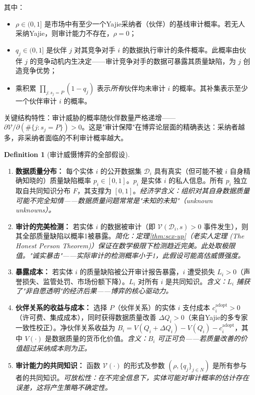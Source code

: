 \documentclass[12pt,a4paper]{ctexart}
\theoremstyle{definition}
\newtheorem{definition}{Definition}[section]
\theoremstyle{remark}
\begin{document}
其中：
\begin{itemize}[itemsep=2pt]
\item $\rho \in (0, 1]$ 是市场中有至少一个Yajie采纳者（伙伴）的基线审计概率。若无人采纳Yajie，则审计能力不存在，$\rho = 0$；
\item $q_j \in (0, 1]$ 是伙伴 $j$ 对其竞争对手 $i$ 的数据执行审计的条件概率。此概率由伙伴 $j$ 的竞争动机内生决定——审计竞争对手的数据可暴露其质量缺陷，为 $j$ 创造竞争优势；
\item 乘积累 $\prod_{j: s_j = P} (1 - q_j)$ 表示\textit{所有}伙伴均未审计 $i$ 的概率。其补集表示至少一个伙伴审计 $i$ 的概率。
\end{itemize}

关键结构特性：审计威胁的概率随伙伴数量严格递增——$\partial \mathcal{V} / \partial (\#\{j: s_j = P\}) > 0$。这是"审计保障"在博弈论层面的精确表达：采纳者越多，非采纳者面临的不利审计概率越大。

\begin{definition}[审计威慑博弈的全部假设]
\label{def:ad-assumptions}
\begin{enumerate}[label=\textbf{D\arabic*}, leftmargin=*, itemsep=4pt]
\item \textbf{数据质量分布：} 每个实体 $i$ 的公开数据集 $\mathcal{D}_i$ 具有真实（但可能不被 $i$ 自身精确知晓的）质量缺陷概率 $p_i \in [0,1]$。$p_i$ 是实体 $i$ 的私人信息。所有 $p_i$ 独立取自共同知识分布 $F$，其支撑为 $[0,1]$。\hfill\textit{经济学含义：组织对其自身数据质量可能不完全知情——数据质量问题常常是"未知的未知"（unknown unknowns）。}

\item \textbf{审计的完美检测：} 若实体 $i$ 的数据被审计（即 $\mathcal{V}(\mathcal{D}_i, s) > 0$ 事件发生），则其全部质量缺陷以概率1被暴露。\hfill\textit{简化：定理\ref{thm:scx-up}（老实人定理 (The Honest Person Theorem)）保证在数学极限下检测趋近完美。此处取极限值。"诚实暴击"——实际审计的检测概率小于1，此假设可能高估威慑强度。}

\item \textbf{暴露成本：} 若实体 $i$ 的质量缺陷被公开审计报告暴露，$i$ 遭受损失 $L_i > 0$（声誉损失、监管处罚、市场份额下降）。$L_i$ 对所有 $i$ 是共同知识。\hfill\textit{含义：$L_i$ 捕获了"非自愿透明"的经济后果——博弈的核心驱动力。}

\item \textbf{伙伴关系的收益与成本：} 选择 $P$（伙伴关系）的实体 $i$ 支付成本 $c_i^{\text{adopt}} > 0$（许可费、集成成本），同时获得数据质量改善 $\Delta Q_i > 0$（来自Yajie的多专家一致性校正）。净伙伴关系收益为 $B_i = V(Q_i + \Delta Q_i) - V(Q_i) - c_i^{\text{adopt}}$，其中 $V(\cdot)$ 是数据质量的货币化价值。\hfill\textit{含义：$B_i$ 可正可负——若质量改善的价值超过采纳成本则为正。}

\item \textbf{审计能力的共同知识：} 函数 $\mathcal{V}(\cdot)$ 的形式及参数 $(\rho, \{q_j\}_{j \in N})$ 是所有参与者的共同知识。\hfill\textit{可放松性：在不完全信息下，实体可能对审计概率的估计存在误差，这将产生策略不确定性。}
\end{enumerate}
\end{definition}
\end{document}
